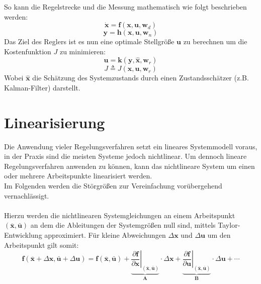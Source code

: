 So kann die Regelstrecke und die Messung mathematisch wie folgt beschrieben werden:
\begin{equation}
    \dot{\mathbf{x}} = \mathbf{f}(\mathbf{x},\mathbf{u},\mathbf{w}_d)
\end{equation}
\begin{equation}
    \mathbf{y} = \mathbf{h}(\mathbf{x},\mathbf{u},\mathbf{w}_n)
\end{equation}
Das Ziel des Reglers ist es nun eine optimale Stellgröße $\mathbf{u}$ zu berechnen um die Kostenfunktion $J$ zu minimieren:
\begin{equation}
    \mathbf{u} = \mathbf{k}(\mathbf{y},\hat{\mathbf{x}}, \mathbf{w}_r)
\end{equation}
\begin{equation}
    J \triangleq J(\mathbf{x},\mathbf{u},\mathbf{w}_r)
\end{equation}
Wobei $\hat{\mathbf{x}}$ die Schätzung des Systemzustands durch einen Zustandsschätzer (z.B. Kalman-Filter) darstellt.

\section{Linearisierung}
\label{sec:linearisierung}
Die Anwendung vieler Regelungsverfahren setzt ein lineares Systemmodell voraus, in der Praxis sind die meisten Systeme jedoch nichtlinear. Um dennoch lineare Regelungsverfahren anwenden zu können, kann das nichtlineare System um einen oder mehrere Arbeitspunkte linearisiert werden. 
\\Im Folgenden werden die Störgrößen zur Vereinfachung vorübergehend vernachlässigt.
\\\\
Hierzu werden die nichtlinearen Systemgleichungen an einem Arbeitspunkt $(\bar{\mathbf{x}}, \bar{\mathbf{u}})$ an dem die Ableitungen der Systemgrößen null sind, mittels Taylor-Entwicklung approximiert. Für kleine Abweichungen $\Delta \mathbf{x}$ und $\Delta \mathbf{u}$ um den Arbeitspunkt gilt somit:
\begin{equation}
\mathbf{f}(\bar{\mathbf{x}} + \Delta \mathbf{x}, \bar{\mathbf{u}} + \Delta \mathbf{u}) = \mathbf{f}(\bar{\mathbf{x}}, \bar{\mathbf{u}}) + \underbrace{\left. \frac{\partial \mathbf{f}}{\partial \mathbf{x}} \right|_{(\bar{\mathbf{x}}, \bar{\mathbf{u}})}}_{\mathbf{A}} \cdot \Delta \mathbf{x} + \underbrace{\left. \frac{\partial \mathbf{f}}{\partial \mathbf{u}} \right|_{(\bar{\mathbf{x}}, \bar{\mathbf{u}})}}_{\mathbf{B}} \cdot \Delta \mathbf{u} + \cdots
\end{equation}

